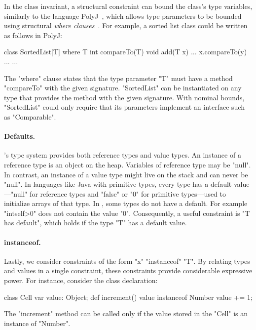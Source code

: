 In the class invariant, a structural constraint can bound the
class's type variables, similarly to 
the language PolyJ~\cite{java-popl97}, which allows type
parameters to be
bounded using
structural \emph{where clauses}~\cite{where-clauses}.
For example, a sorted list class
could be written as follows in PolyJ:
{
\begin{xtennoindent}
class SortedList[T]
    where T {int compareTo(T)} {
  void add(T x) {... x.compareTo(y) ...}
  ...
}
\end{xtennoindent}}
The \xcd"where" clause states that the type parameter
\xcd"T" must have a
method \xcd"compareTo" with the given signature.
\xcd"SortedList" can be instantiated on any type
that provides the method with the given signature.
With nominal bounds, \xcd"SortedList" could only require that
its parameters implement an interface such as \xcd"Comparable".

\paragraph{Defaults.}
\Xten's type system provides both reference types and value
types.  An instance of a reference type is an object on the
heap.  Variables of reference type may be \xcd"null".
In contrast, an instance of a value type might live on the stack
and can never be \xcd"null".  In languages like Java with
primitive types, every type has a default value---\xcd"null" for
reference types and \xcd"false" or \xcd"0" for primitive
types---used to initialize arrays of that type.
In \Xten, some types do not have a default.  For example
\xcd"int{self>0}" does not contain the value \xcd"0".
Consequently, a useful constraint is \xcd"T has default", which
holds if the type \xcd"T" has a default value.

\paragraph{instanceof.}
Lastly, we consider constraints of the form \xcd"x" \xcd"instanceof" \xcd"T".
By relating types and values in a single constraint, 
these constraints provide considerable expressive power.
For instance, 
consider the class declaration:
\begin{xtennoindent}
class Cell {
  var value: Object;
  def increment() {value instanceof Number} { value += 1; }
}
\end{xtennoindent}
The \xcd"increment" method can be called only if the value
stored in the \xcd"Cell" is an instance of \xcd"Number".

